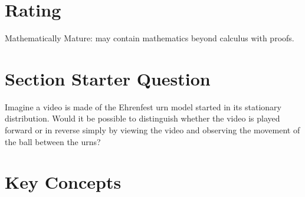 \documentclass[12pt]{article}
\begin{document}
\myheader
\mytitle

\hr


\hr

\usefirefox



\hr

\section*{Rating} %
Mathematically Mature: may contain mathematics beyond calculus with proofs.

\hr

\section*{Section Starter Question}

Imagine a video is made of the Ehrenfest urn model started in its
stationary distribution.  Would it be possible to distinguish whether
the video is played forward or in reverse simply by viewing the video
and observing the movement of the ball between the urns?

\hr

\section*{Key Concepts}
\end{document}
